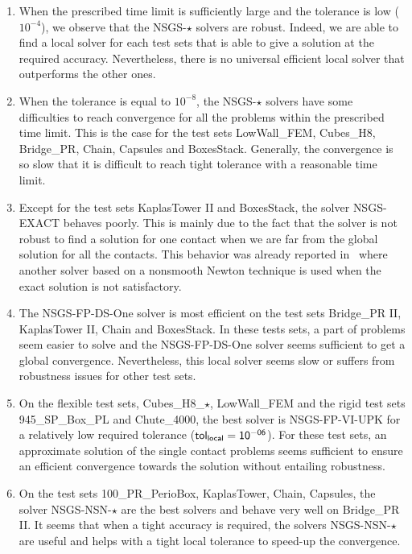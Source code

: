 \begin{enumerate}
\item When the prescribed time limit is sufficiently large and the tolerance is low ($10^{-4}$), we observe that the {\sf NSGS-$\star$} solvers are robust. Indeed, we are able to find a local solver for each test sets that is able to give a solution at the required accuracy. Nevertheless, there is no universal efficient local solver that outperforms the other ones.
  
\item When the tolerance is equal to $10^{-8}$,  the {\sf NSGS-$\star$} solvers have some difficulties to reach convergence for all the problems within the prescribed time limit. This is the case for the test sets LowWall\_FEM, Cubes\_H8, Bridge\_PR, Chain,  Capsules and BoxesStack. Generally, the convergence is so slow that it is difficult to reach tight tolerance with a reasonable time limit.
 
\item Except for the test sets KaplasTower II and BoxesStack, the solver {\sf NSGS-EXACT} behaves poorly. This is mainly due to the fact that the solver is not robust to find a solution for one contact when we are far from the global solution for all the contacts. This behavior was already reported in~\citep{Daviet.ea_SIGGRAPH2011} where another solver based on a nonsmooth Newton technique is used when  the exact solution is not satisfactory.
  
\item  The {\sf NSGS-FP-DS-One} solver  is most efficient on the test sets Bridge\_PR II, KaplasTower II, Chain and BoxesStack. In these tests sets, a part of problems seem easier to solve and the {\sf NSGS-FP-DS-One} solver seems sufficient to get a global convergence.
  Nevertheless, this local solver seems slow or suffers from robustness issues for other test sets.
  
\item On the flexible test sets, Cubes\_H8\_$\star$, LowWall\_FEM and the rigid test sets 945\_SP\_Box\_PL and  Chute\_4000, the best solver is {\sf NSGS-FP-VI-UPK} for a relatively low required tolerance ($\sf tol_{local} =10^{-06}$). For these test sets, an approximate solution of the single contact problems seems sufficient to ensure an efficient convergence towards the solution without entailing robustness.
  
\item On the test sets 100\_PR\_PerioBox, KaplasTower,  Chain, Capsules, the solver {\sf NSGS-NSN-$\star$} are the best solvers and behave very well on Bridge\_PR II. It seems that when a tight accuracy is required, the solvers {\sf NSGS-NSN-$\star$} are useful and helps with a tight local tolerance to speed-up the convergence.
  

\end{enumerate}
